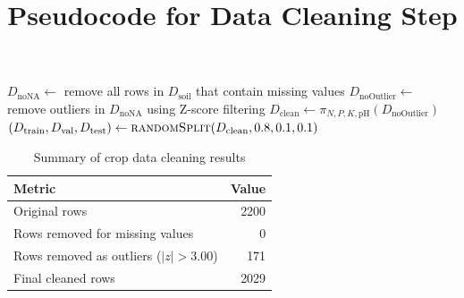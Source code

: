 \documentclass[11pt]{article}
\title{Pseudocode for Data Cleaning Step}
\author{}
\date{}
\begin{document}
\maketitle

\begin{algorithm}
\caption{Crop Feature Engineering}
\begin{algorithmic}[1]
\State $D_{\text{noNA}} \gets$ remove all rows in $D_{\text{soil}}$ that contain missing values
\State $D_{\text{noOutlier}} \gets$ remove outliers in $D_{\text{noNA}}$ using Z-score filtering
\State $D_{\text{clean}} \gets \pi_{N, P, K, \text{pH}}(D_{\text{noOutlier}})$ 
\State $(D_{\text{train}}, D_{\text{val}}, D_{\text{test}}) \gets \Call{randomSplit}{D_{\text{clean}}, 0.8, 0.1, 0.1}$
\end{algorithmic}
\end{algorithm}

\begin{table}[h]
\centering
\caption{Summary of crop data cleaning results}
\begin{tabular}{|l|r|}
\hline
\textbf{Metric} & \textbf{Value} \\
\hline
Original rows & 2200 \\
Rows removed for missing values & 0 \\
Rows removed as outliers ($|z| > 3.00$) & 171 \\
Final cleaned rows & 2029 \\
\hline
\end{tabular}
\end{table}
\end{document}
